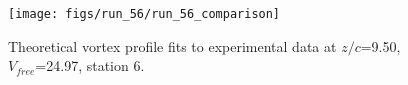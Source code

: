 \begin{figure}[H]
\centering
\texttt{[image: figs/run\_56/run\_56\_comparison]}
\caption{Theoretical vortex profile fits to experimental data at $z/c$=9.50, $V_{free}$=24.97, station 6.}
\label{fig:run_56_comparison}
\end{figure}


